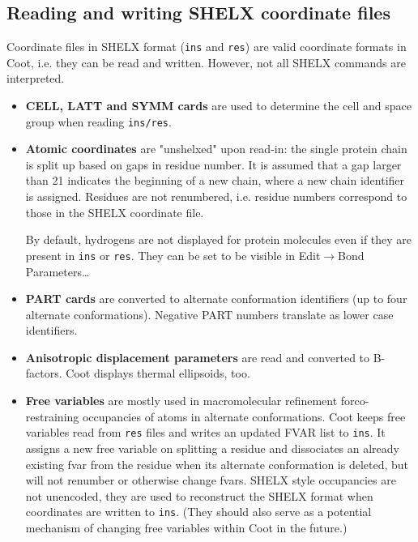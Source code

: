 \documentclass{article}
\begin{document}
\subsection{Reading and writing SHELX coordinate files}
Coordinate files in SHELX format (\texttt{ins} and \texttt{res}) are
valid coordinate formats in Coot, i.e. they can be read and written.
However, not all SHELX commands are interpreted.

\begin{itemize}

\item {\bf CELL, LATT and SYMM cards} are used to determine the cell
  and space group when reading \texttt{ins/res}.

\item {\bf Atomic coordinates} are "unshelxed" upon read-in: the
  single protein chain is split up based on gaps in residue number. It
  is assumed that a gap larger than 21 indicates the beginning of a
  new chain, where a new chain identifier is assigned. Residues are
  not renumbered, i.e. residue numbers correspond to those in the
  SHELX coordinate
  file. %

  By default, hydrogens are not displayed for protein molecules even
  if they are present in \texttt{ins} or \texttt{res}. They can be set
  to be visible in \textsf{Edit$\to$Bond Parameters\ldots}

\item {\bf PART cards} are converted to alternate conformation
  identifiers (up to four alternate conformations). Negative PART
  numbers translate as lower case identifiers.

\item {\bf Anisotropic displacement parameters} are read and converted
  to B-factors. Coot displays thermal ellipsoids,
  too.%

\item {\bf Free variables} are mostly used in macromolecular
  refinement for\linebreak[4]co-restraining occupancies of atoms in
  alternate conformations. Coot keeps free variables read from
  \texttt{res} files and writes an updated FVAR list to \texttt{ins}.
  It assigns a new free variable on splitting a residue and
  dissociates an already existing fvar from the residue when its
  alternate conformation is deleted, but will not renumber or
  otherwise change fvars. SHELX style occupancies are not unencoded,
  they are used to reconstruct the SHELX format when coordinates are
  written to \texttt{ins}. (They should also serve as a potential
  mechanism of changing free variables within Coot in the future.)


\end{itemize}
\end{document}
